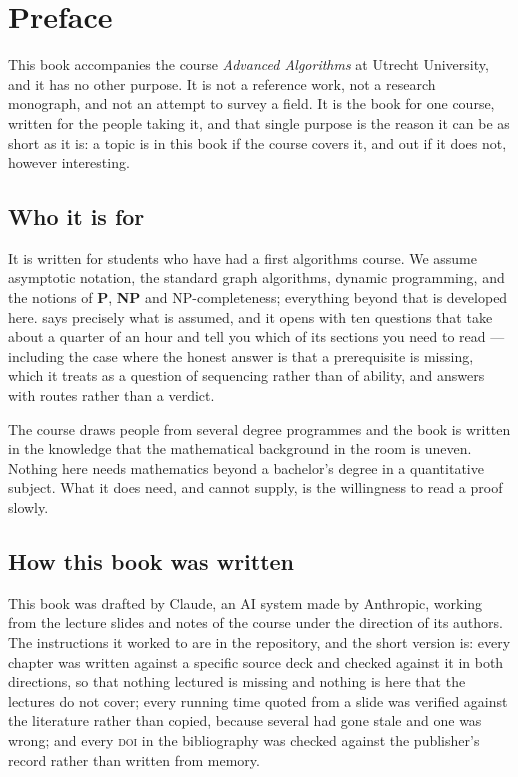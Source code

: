 \chapter*{Preface}

This book accompanies the course \emph{Advanced Algorithms} at Utrecht
University, and it has no other purpose. It is not a reference work, not a
research monograph, and not an attempt to survey a field. It is the book for
one course, written for the people taking it, and that single purpose is the
reason it can be as short as it is: a topic is in this book if the course
covers it, and out if it does not, however interesting.

\section*{Who it is for}

It is written for students who have had a first algorithms course. We assume
asymptotic notation, the standard graph algorithms, dynamic programming, and
the notions of \textbf{P}, \textbf{NP} and \textrm{NP}-completeness; everything
beyond that is developed here.  says precisely what is
assumed, and it opens with ten questions that take about a quarter of an hour
and tell you which of its sections you need to read --- including the case
where the honest answer is that a prerequisite is missing, which it treats as a
question of sequencing rather than of ability, and answers with routes rather
than a verdict.

The course draws people from several degree programmes and the book is written
in the knowledge that the mathematical background in the room is uneven.
Nothing here needs mathematics beyond a bachelor's degree in a quantitative
subject. What it does need, and cannot supply, is the willingness to read a
proof slowly.

\section*{How this book was written}

This book was drafted by Claude, an AI system made by Anthropic, working from
the lecture slides and notes of the course under the direction of its authors.
The instructions it worked to are in the repository, and the short version is:
every chapter was written against a specific source deck and checked against it
in both directions, so that nothing lectured is missing and nothing is here that
the lectures do not cover; every running time quoted from a slide was verified
against the literature rather than copied, because several had gone stale and
one was wrong; and every \textsc{doi} in the bibliography was checked against
the publisher's record rather than written from memory.

